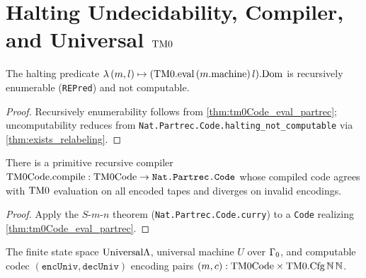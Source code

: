 \chapter{Halting Undecidability, Compiler, and Universal $\mathrm{TM0}$}

\begin{theorem}
  \label{thm:halting_undecidable}
  \leanok
  The halting predicate $\lambda\,(m, l) \mapsto (\mathrm{TM0}.\mathrm{eval}\,(m.\mathrm{machine})\,l).\mathrm{Dom}$ is recursively enumerable (\texttt{REPred}) and not computable.
\end{theorem}
\begin{proof}
  \leanok
  Recursively enumerability follows from \ref{thm:tm0Code_eval_partrec}; uncomputability reduces from \texttt{Nat.Partrec.Code.halting\_not\_computable} via \ref{thm:exists_relabeling}.
\end{proof}

\begin{theorem}
  \label{thm:compile}
  \leanok
  There is a primitive recursive compiler $\mathrm{TM0Code.compile} : \mathrm{TM0Code} \to \texttt{Nat.Partrec.Code}$ whose compiled code agrees with $\mathrm{TM0}$ evaluation on all encoded tapes and diverges on invalid encodings.
\end{theorem}
\begin{proof}
  \leanok
  Apply the $S$-$m$-$n$ theorem (\texttt{Nat.Partrec.Code.curry}) to a \texttt{Code} realizing \ref{thm:tm0Code_eval_partrec}.
\end{proof}

\begin{definition}
  \label{def:universal_tm0}
  \leanok
  The finite state space $\mathrm{Universal}\Lambda$, universal machine $U$ over $\Gamma_0$, and computable codec $(\texttt{encUniv}, \texttt{decUniv})$ encoding pairs $(m, c) : \mathrm{TM0Code} \times \mathrm{TM0}.\mathrm{Cfg}\,\mathbb{N}\,\mathbb{N}$.
\end{definition}

